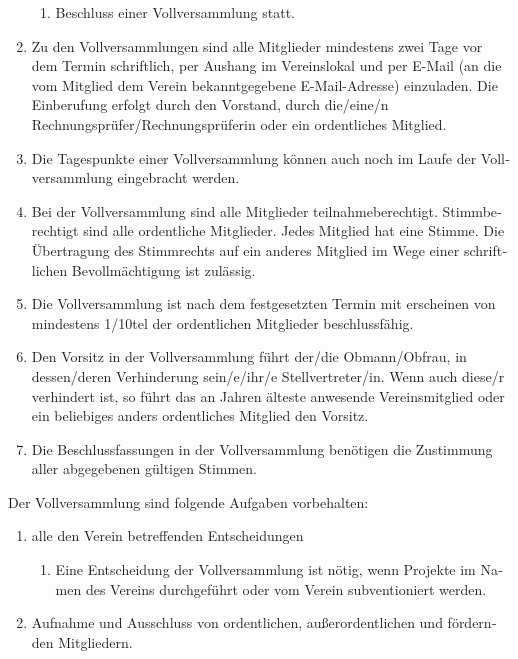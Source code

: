 \begin{otherlanguage}{german}
\begin{enumerate}[statutenenum]
\begin{enumerate}[statutenenum]
            \item Beschluss einer Vollversammlung statt.
        \end{enumerate}

    \item Zu den Vollversammlungen sind alle Mitglieder mindestens zwei Tage vor dem Termin schriftlich, per Aushang im Vereinslokal und per E-Mail (an die vom Mitglied dem Verein bekanntgegebene E-Mail-Adresse) einzuladen.
        Die Einberufung erfolgt durch den Vorstand, durch die/eine/n Rechnungsprüfer/Rechnungsprüferin oder ein ordentliches Mitglied.

    \item Die Tagespunkte einer Vollversammlung können auch noch im Laufe der Vollversammlung eingebracht werden.

    \item Bei der Vollversammlung sind alle Mitglieder teilnahmeberechtigt.
        Stimmberechtigt sind alle ordentliche Mitglieder.
        Jedes Mitglied hat eine Stimme.
        Die Übertragung des Stimmrechts auf ein anderes Mitglied im Wege einer schriftlichen Bevollmächtigung ist zulässig.

    \item Die Vollversammlung ist nach dem festgesetzten Termin mit erscheinen von mindestens 1/10tel der ordentlichen Mitglieder beschlussfähig.

    \item Den Vorsitz in der Vollversammlung führt der/die Obmann/Obfrau, in dessen/deren Verhinderung sein/e/ihr/e Stellvertreter/in.
        Wenn auch diese/r verhindert ist, so führt das an Jahren älteste anwesende Vereinsmitglied oder ein beliebiges anders ordentliches Mitglied den Vorsitz.

    \item Die Beschlussfassungen in der Vollversammlung benötigen die Zustimmung aller abgegebenen gültigen Stimmen.
\end{enumerate}


Der Vollversammlung sind folgende Aufgaben vorbehalten:

\begin{enumerate}[statutenenum]
    \item alle den Verein betreffenden Entscheidungen
        \begin{enumerate}[statutenenum]
            \item Eine Entscheidung der Vollversammlung ist nötig, wenn Projekte im Namen des Vereins durchgeführt oder vom Verein subventioniert werden.
        \end{enumerate}
    \item Aufnahme und Ausschluss von ordentlichen, außerordentlichen und fördernden Mitgliedern.
\end{enumerate}


\end{otherlanguage}
